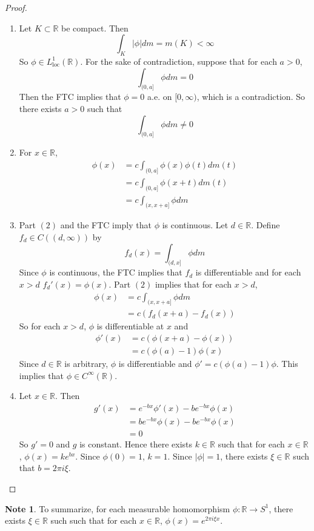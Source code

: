 \documentclass[12pt]{amsart}
\theoremstyle{definition}
\newtheorem{note}[definition]{Note}
\newcommand{\R}{\mathbb{R}}
\newcommand{\Rg}{[0,\infty)}
\newcommand{\loc}{\text{loc}}
\begin{document}
	\begin{proof}\
	\begin{enumerate}
	\item Let $K \subset \R$ be compact. Then $$\int_K |\phi| dm = m(K) < \infty$$ So $\phi \in L^1_{\loc}(\R)$. For the sake of contradiction, suppose that for each $a >0$, $$\int_{(0,a]}\phi dm = 0$$ 
	Then the FTC implies that $\phi = 0$ a.e. on $\Rg$, which is a contradiction. So there exists $a > 0$ such that $$\int_{(0,a]}\phi dm \neq 0$$
	\item For $x \in \R$, 
	\begin{align*}
	\phi(x) 
	&= c \int_{(0,a]} \phi(x)\phi(t) dm(t) \\
	&= c \int_{(0,a]} \phi(x+t) dm(t) \\
	&= c \int_{(x,x+a]} \phi dm 
	\end{align*}
	\item Part $(2)$ and the FTC imply that $\phi$ is continuous. Let $d \in \R$. Define $f_d \in C((d, \infty))$ by $$f_d(x) = \int_{(d, x]} \phi dm$$ 
	Since $\phi$ is continuous, the FTC implies that $f_d$ is differentiable and for each $x >d$ $f_d'(x) = \phi(x)$. Part $(2)$ implies that for each $x > d$,
	\begin{align*}
	\phi(x) 
	&= c \int_{(x,x+a]} \phi dm \\
	&= c(f_d(x+a) - f_d(x))
	\end{align*}
	So for each $x > d$, $\phi$ is differentiable at $x$ and 
	\begin{align*}
	\phi'(x) 
	&= c(\phi(x+a) - \phi(x)) \\
	&= c(\phi(a) - 1) \phi(x)
\end{align*}	 
	Since $d \in \R$ is arbitrary, $\phi$ is differentiable and $\phi' = c(\phi(a) - 1) \phi$. This implies that $\phi \in C^{\infty}(\R)$.
	\item Let $x \in \R$. Then 
	\begin{align*}
	g'(x) 
	&= e^{-bx}\phi'(x) - be^{-bx}\phi(x) \\
	&= be^{-bx} \phi(x) - be^{-bx}\phi(x) \\
	&= 0
	\end{align*}
	So $g' = 0$ and $g$ is constant. Hence there exists $k \in \R$ such that for each $x \in \R$, $\phi(x) = ke^{bx}$. Since $\phi(0) = 1$, $k = 1$. Since $|\phi| = 1$, there exists $\xi \in \R$ such that $b = 2 \pi i \xi$. 
	\end{enumerate}
	\end{proof}
	
	\begin{note}
	To summarize, for each measurable homomorphism $\phi:\R \rightarrow S^1$, there exists $\xi \in \R$ such  such that for each $x \in \R$, $\phi(x) = e^{2 \pi i  \xi x}$. 
	\end{note}
	
\end{document}
